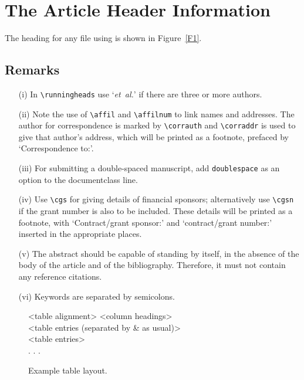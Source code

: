 \documentclass[times]{fldauth}
\begin{document}
\section{The Article Header Information}
The heading for any file using \textsf{\journalclass} is shown in
Figure~\ref{F1}.

\subsection{Remarks}
\begin{enumerate}
\item[(i)] In \verb"\runningheads" use `\emph{et~al.}' if there
are three or more authors.

\item[(ii)] Note the use of \verb"\affil" and \verb"\affilnum" to
link names and addresses. The author for correspondence is marked
by \verb"\corrauth" and \verb"\corraddr" is used to give that
author's address, which will be printed as a footnote, prefaced by
`Correspondence to:'.

\item[(iii)] For submitting a double-spaced manuscript, add
\verb"doublespace" as an option to the documentclass line.

\item[(iv)] Use \verb"\cgs" for giving details of financial
sponsors; alternatively use \verb"\cgsn" if the grant number is
also to be included. These details will be printed as a footnote,
with `Contract/grant sponsor:' and `contract/grant number:'
inserted in the appropriate places.

\item[(v)] The abstract should be capable of standing by itself,
in the absence of the body of the article and of the bibliography.
Therefore, it must not contain any reference citations.

\item[(vi)] Keywords are separated by semicolons.
\end{enumerate}

\begin{figure}
\setlength{\fboxsep}{0pt}%
\setlength{\fboxrule}{0pt}%
\begin{center}
\begin{boxedverbatim}
\begin{table}
\caption{<Table caption>}
\centering
\tabsize
\begin{tabular}{<table alignment>}
\toprule
<column headings>\\
\midrule
<table entries
(separated by & as usual)>\\
<table entries>\\
.
.
.\\
\bottomrule
\end{tabular}
\end{table}
\end{boxedverbatim}
\end{center}
\vspace{-6pt}
\caption{Example table layout.\label{F2}}
\vspace{-6pt}
\end{figure}
\end{document}
